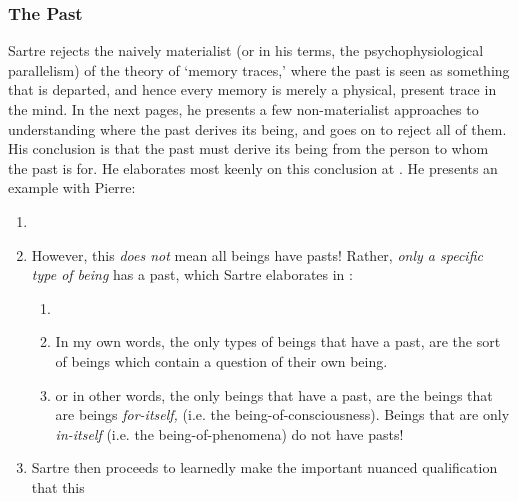 \subsubsection*{The Past}
Sartre rejects the naively materialist (or in his terms, the psychophysiological parallelism) of the theory of `memory traces,' where the past is seen as something that is departed, and hence every memory is merely a physical, present trace in the mind. In the next pages, he presents a few non-materialist approaches to understanding where the past derives its being, and goes on to reject all of them. His conclusion is that the past must derive its being from the person to whom the past is for. He elaborates most keenly on this conclusion at \autocite[169]{sartre}. He presents an example with Pierre:

\begin{enumerate}
  \item {}
  \item {} However, this \emph{does not} mean all beings have pasts! Rather, \emph{only a specific type of being} has a past, which Sartre elaborates in \autocite[172]{sartre}:
  \begin{enumerate}
    \item {}
    \item In my own words, the only types of beings that have a past, are the sort of beings which contain a question of their own being.
    \item or in other words, the only beings that have a past, are the beings that are beings \emph{for-itself,} (i.e. the being-of-consciousness). Beings that are only \emph{in-itself} (i.e. the being-of-phenomena) do not have pasts!
  \end{enumerate}
  \item Sartre then proceeds to learnedly make the important nuanced qualification that this 

\end{enumerate}

